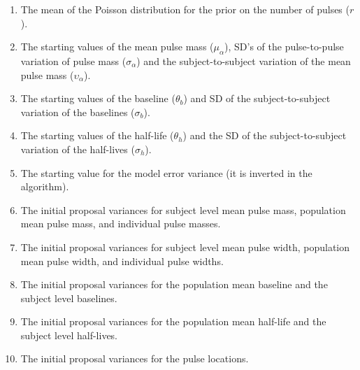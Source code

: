 \documentclass[12pt, oneside]{article}   	%
\begin{document}
\begin{enumerate}
\item The mean of the Poisson distribution for the prior on the number of pulses ($r$).
\item The starting values of the mean  pulse mass ($\mu_\alpha$), SD's of the pulse-to-pulse variation of  pulse mass ($\sigma_\alpha$) and the subject-to-subject variation of the mean  pulse mass ($\upsilon_\alpha$).
\item The starting values of the baseline ($\theta_b$) and SD of the subject-to-subject variation of the baselines ($\sigma_b$).
\item The starting values of the half-life ($\theta_h$) and the SD of the subject-to-subject variation of the half-lives ($\sigma_h$).
\item The starting value for the model error variance (it is inverted in the algorithm).
\item The initial proposal variances for subject level mean  pulse mass, population mean  pulse mass, and individual  pulse masses.
\item The initial proposal variances for subject level mean  pulse width, population mean  pulse width, and individual  pulse widths.
\item The initial proposal variances for the population mean baseline and the subject level baselines.
\item The initial proposal variances for the population mean half-life and the subject level half-lives.
\item The initial proposal variances for the pulse locations.
\end{enumerate}
\end{document}
